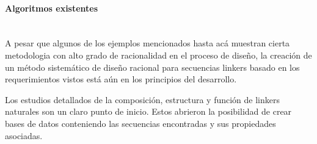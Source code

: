 




\paragraph{Algoritmos existentes} \hspace{0pt} \\


A pesar que algunos de los ejemplos mencionados hasta acá muestran cierta metodologia con alto grado de racionalidad en el proceso de diseño, 
la creación de un método sistemático de diseño racional para secuencias linkers basado en los requerimientos vistos está aún en los principios del desarrollo. 




Los estudios detallados de la composición, estructura y función de linkers naturales son un claro punto de inicio.
Estos abrieron la posibilidad de crear bases de datos conteniendo las secuencias encontradas y sus propiedades asociadas.


